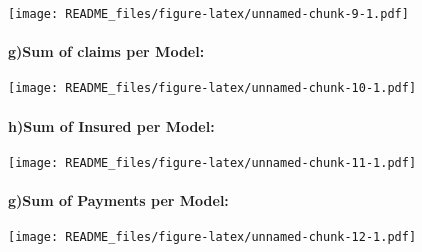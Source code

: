 \documentclass[
]{article}
\begin{document}
\texttt{[image: README\_files/figure-latex/unnamed-chunk-9-1.pdf]}

\hypertarget{gsum-of-claims-per-model}{%
\paragraph{g)Sum of claims per Model:}\label{gsum-of-claims-per-model}}

\texttt{[image: README\_files/figure-latex/unnamed-chunk-10-1.pdf]}

\hypertarget{hsum-of-insured-per-model}{%
\paragraph{h)Sum of Insured per
Model:}\label{hsum-of-insured-per-model}}

\texttt{[image: README\_files/figure-latex/unnamed-chunk-11-1.pdf]}

\hypertarget{gsum-of-payments-per-model}{%
\paragraph{g)Sum of Payments per
Model:}\label{gsum-of-payments-per-model}}

\texttt{[image: README\_files/figure-latex/unnamed-chunk-12-1.pdf]}
\end{document}
